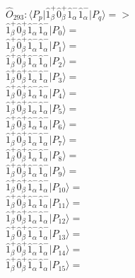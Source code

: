 \documentclass[14pt]{article}
\begin{document}
    $\hat{O}_{293}:  \langle{P_p}\vert \hat{1}_{\beta}^{+}\hat{0}_{\beta}^{+}\hat{1}_{\alpha}^{-}\hat{1}_{\alpha}^{-} \vert{P_q}\rangle => $ \\ 
    $ \hat{1}_{\beta}^{+}\hat{0}_{\beta}^{+}\hat{1}_{\alpha}^{-}\hat{1}_{\alpha}^{-} \vert{P_{0}}\rangle =  $ \\ 
    $ \hat{1}_{\beta}^{+}\hat{0}_{\beta}^{+}\hat{1}_{\alpha}^{-}\hat{1}_{\alpha}^{-} \vert{P_{1}}\rangle =  $ \\ 
    $ \hat{1}_{\beta}^{+}\hat{0}_{\beta}^{+}\hat{1}_{\alpha}^{-}\hat{1}_{\alpha}^{-} \vert{P_{2}}\rangle =  $ \\ 
    $ \hat{1}_{\beta}^{+}\hat{0}_{\beta}^{+}\hat{1}_{\alpha}^{-}\hat{1}_{\alpha}^{-} \vert{P_{3}}\rangle =  $ \\ 
    $ \hat{1}_{\beta}^{+}\hat{0}_{\beta}^{+}\hat{1}_{\alpha}^{-}\hat{1}_{\alpha}^{-} \vert{P_{4}}\rangle =  $ \\ 
    $ \hat{1}_{\beta}^{+}\hat{0}_{\beta}^{+}\hat{1}_{\alpha}^{-}\hat{1}_{\alpha}^{-} \vert{P_{5}}\rangle =  $ \\ 
    $ \hat{1}_{\beta}^{+}\hat{0}_{\beta}^{+}\hat{1}_{\alpha}^{-}\hat{1}_{\alpha}^{-} \vert{P_{6}}\rangle =  $ \\ 
    $ \hat{1}_{\beta}^{+}\hat{0}_{\beta}^{+}\hat{1}_{\alpha}^{-}\hat{1}_{\alpha}^{-} \vert{P_{7}}\rangle =  $ \\ 
    $ \hat{1}_{\beta}^{+}\hat{0}_{\beta}^{+}\hat{1}_{\alpha}^{-}\hat{1}_{\alpha}^{-} \vert{P_{8}}\rangle =  $ \\ 
    $ \hat{1}_{\beta}^{+}\hat{0}_{\beta}^{+}\hat{1}_{\alpha}^{-}\hat{1}_{\alpha}^{-} \vert{P_{9}}\rangle =  $ \\ 
    $ \hat{1}_{\beta}^{+}\hat{0}_{\beta}^{+}\hat{1}_{\alpha}^{-}\hat{1}_{\alpha}^{-} \vert{P_{10}}\rangle =  $ \\ 
    $ \hat{1}_{\beta}^{+}\hat{0}_{\beta}^{+}\hat{1}_{\alpha}^{-}\hat{1}_{\alpha}^{-} \vert{P_{11}}\rangle =  $ \\ 
    $ \hat{1}_{\beta}^{+}\hat{0}_{\beta}^{+}\hat{1}_{\alpha}^{-}\hat{1}_{\alpha}^{-} \vert{P_{12}}\rangle =  $ \\ 
    $ \hat{1}_{\beta}^{+}\hat{0}_{\beta}^{+}\hat{1}_{\alpha}^{-}\hat{1}_{\alpha}^{-} \vert{P_{13}}\rangle =  $ \\ 
    $ \hat{1}_{\beta}^{+}\hat{0}_{\beta}^{+}\hat{1}_{\alpha}^{-}\hat{1}_{\alpha}^{-} \vert{P_{14}}\rangle =  $ \\ 
    $ \hat{1}_{\beta}^{+}\hat{0}_{\beta}^{+}\hat{1}_{\alpha}^{-}\hat{1}_{\alpha}^{-} \vert{P_{15}}\rangle =  $ \\ 
    
\end{document}
